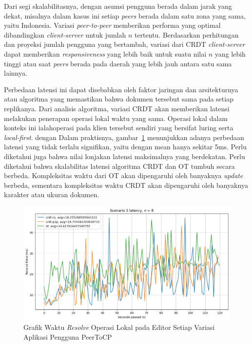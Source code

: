 Dari segi skalabilitasnya, dengan asumsi pengguna berada dalam jarak yang dekat, misalnya dalam kasus ini setiap \textit{peers} berada dalam satu zona yang sama, yaitu Indonesia. Variasi \textit{peer-to-peer} memberikan performa yang optimal dibandingkan \textit{client-server} untuk jumlah $n$ tertentu. Berdasarkan perhitungan dan proyeksi jumlah pengguna yang bertambah, variasi dari CRDT \textit{client-server} dapat memberikan \textit{responsiveness} yang lebih baik untuk suatu nilai $n$ yang lebih tinggi atau saat \textit{peers} berada pada daerah yang lebih jauh antara satu sama lainnya.

Perbedaan latensi ini dapat disebabkan oleh faktor jaringan dan arsitekturnya atau algoritma yang memastikan bahwa dokumen tersebut sama pada setiap replikanya. Dari analisis algoritma, variasi CRDT akan memberikan latensi melakukan penerapan operasi lokal waktu yang sama. Operasi lokal dalam konteks ini ialahoperasi pada klien tersebut sendiri yang bersifat luring serta \textit{local-first}. dengan  Dalam praktisnya, gambar~\ref{fig:12-5} menunjukkan adanya perbedaan latensi yang tidak terlalu signifikan, yaitu dengan mean hanya sekitar 5ms. Perlu diketahui juga bahwa nilai lonjakan latensi maksimalnya yang berdekatan. Perlu diketahui bahwa skalabilitas latensi algoritma CRDT dan OT tumbuh secara berbeda. Kompleksitas waktu dari OT akan dipengaruhi oleh banyaknya \textit{update} berbeda, sementara kompleksitas waktu CRDT akan dipengaruhi oleh banyaknya karakter atau ukuran dokumen.

\begin{figure}
 \centering
 \includegraphics[width=15cm]{./assets/skripsi/benchmark-vis_cell_12_output_5}
 \caption{Grafik Waktu \textit{Resolve} Operasi Lokal pada Editor Setiap Variasi Aplikasi Pengguna PeerToCP}
 \label{fig:12-5}
\end{figure}

